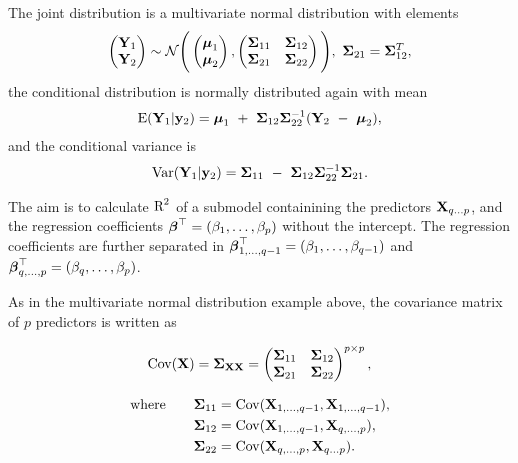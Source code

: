 \documentclass[11pt,a4paper,twoside]{book}
\begin{document}
The joint distribution is a multivariate normal distribution with elements
\begin{align*}
\begin{pmatrix}
\mathbf{Y}_{1} \\ 
\mathbf{Y}_{2} \end{pmatrix} \sim \mathcal{N}
\Bigg(\begin{pmatrix}
\boldsymbol{\mu}_{1} \\ 
\boldsymbol{\mu}_{2} 
\end{pmatrix},
\begin{pmatrix}
{\boldsymbol{\Sigma}}{}_{11} & {\boldsymbol{\Sigma}}{}_{12} \\
{\boldsymbol{\Sigma}}{}_{21} & {\boldsymbol{\Sigma}}{}_{22} \\
\end{pmatrix}\Bigg),
\ {\boldsymbol{\Sigma}}{}_{21} = {\boldsymbol{\Sigma}}{}_{12}^{T},
\end{align*}
the conditional distribution is normally distributed again with mean 
\begin{align*}
\E (\mathbf{Y}_{1} | \mathbf{y}_{2} ) = \boldsymbol{\mu}_{1}\ +\ \bSigma_{12} \bSigma_{22}^{-1}(\mathbf{Y}_{2}\ -\ \boldsymbol{\mu}_{2}),
\end{align*}
and the conditional variance is
\begin{align}
\operatorname{Var} ( \mathbf{Y}_{1} | \mathbf{y}_{2} ) = {\boldsymbol{\Sigma}}{}_{11}\ -\ {\boldsymbol{\Sigma}}{}_{12} {\boldsymbol{\Sigma}}{}_{22}^{-1}{\boldsymbol{\Sigma}}{}_{21} \text{.} \label{eq:condvar} 
\end{align}

The aim is to calculate $\text{R}^2$ of a submodel containining the predictors ${\mathbf{X}}_{q...p}$, and the regression coefficients ${\boldsymbol{\beta}}^\top = (\beta_{1}, \dotsc, \beta_{p})$ without the intercept. The regression coefficients are further separated in ${\boldsymbol{\beta}}^\top_{1  ,\dotsc,  q-1} = (\beta_{1} ,\dotsc, \beta_{q-1})$ and ${\boldsymbol{\beta}}^\top_{q ,\dotsc, p} = (\beta_{q} ,\dotsc, \beta_{p})$. 

As in the multivariate normal distribution example above, the covariance matrix of $p$ predictors is written as 

      \begin{align*} 
\operatorname{Cov}({\mathbf{X}}) =	{\boldsymbol{\Sigma}}{}_{{\mathbf{X}} {\mathbf{X}}} = \begin{pmatrix}
{\boldsymbol{\Sigma}}{}_{11} & {\boldsymbol{\Sigma}}{}_{12} \\
{\boldsymbol{\Sigma}}{}_{21} & {\boldsymbol{\Sigma}}{}_{22}  \\
\end{pmatrix}^{p \times p}, 
   \end{align*}
   
         \begin{align*} 
   \text{where} \qquad {\boldsymbol{\Sigma}}{}_{11} &= \operatorname{Cov}({\mathbf{X}}_{1,\dotsc, q-1}, {\mathbf{X}}_{1 ,\dotsc,q-1}), \\ {\boldsymbol{\Sigma}}{}_{12} &= \operatorname{Cov}({\mathbf{X}}_{1,\dotsc, q-1}, {\mathbf{X}}_{q ,\dotsc, p}),\\ {\boldsymbol{\Sigma}}{}_{22} &= \operatorname{Cov}({\mathbf{X}}_{q ,\dotsc, p}, {\mathbf{X}}_{q \dots p}) \text{.} \nonumber
      \end{align*}
      
\end{document}
